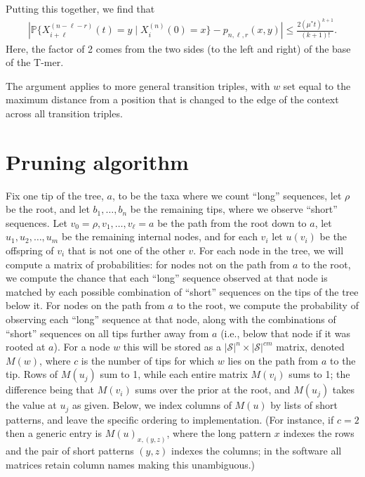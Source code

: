 \documentclass{article}
\renewcommand{\P}{\mathbb{P}}
\newcommand{\calS}{\mathcal{S}}  %
\theoremstyle{plain}
\theoremstyle{definition}
\begin{document}
Putting this together,
we find that
\begin{align*}
    \left|
        \P\{ X_{i+\ell}^{(n-\ell-r)}(t) = y \mid X_i^{(n)}(0) = x \}
        -
        p_{n,\ell,r}(x,y)
    \right|
    \le
    \frac{
        2 (\mu^* t)^{k+1}
    }{
        (k+1)!
    } .
\end{align*}
Here, the factor of 2 comes from the two sides (to the left and right) of the base of the T-mer.

The argument applies to more general transition triples,
with $w$ set equal to the maximum distance
from a position that is changed to the edge of the context
across all transition triples.




\section{Pruning algorithm}
\label{ss:pruning_algorithm}

Fix one tip of the tree, $a$, to be the taxa where we count ``long'' sequences, let $\rho$ be the root, and let $b_1, \ldots, b_n$ be the remaining tips,
where we observe ``short'' sequences.
Let $v_0=\rho, v_1, \ldots, v_\ell = a$ be the path from the root down to $a$,
let $u_1, u_2, \ldots, u_m$ be the remaining internal nodes,
and for each $v_i$ let $u(v_i)$ be the offspring of $v_i$ that is not one of the other $v$.
For each node in the tree,
we will compute a matrix of probabilities:
for nodes not on the path from $a$ to the root,
we compute the chance that each ``long'' sequence observed at that node
is matched by each possible combination of ``short'' sequences on the tips of the tree below it.
For nodes on the path from $a$ to the root, we compute the probability of observing
each ``long'' sequence at that node, along with the combinations of ``short'' sequences
on all tips further away from $a$ (i.e., below that node if it was rooted at $a$).
For a node $w$ this will be stored as a $|\calS|^{n} \times |\calS|^{cm}$ matrix, denoted $M(w)$,
where $c$ is the number of tips for which $w$ lies on the path from $a$ to the tip.
Rows of $M(u_j)$ sum to 1,
while each entire matrix $M(v_i)$ sums to 1;
the difference being that $M(v_i)$ sums over the prior at the root,
and $M(u_j)$ takes the value at $u_j$ as given.
Below, we index columns of $M(u)$ by lists of short patterns,
and leave the specific ordering to implementation.
(For instance, if $c=2$ then a generic entry is $M(u)_{x,(y,z)}$,
where the long pattern $x$ indexes the rows and the pair of short patterns $(y,z)$ indexes the columns;
in the software all matrices retain column names making this unambiguous.)
\end{document}
